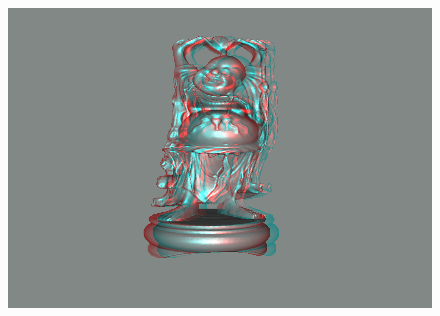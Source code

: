 \documentclass{beamer}
\begin{document}
%
	
\begin{frame} 
\begin{figure}
\hspace*{-1cm}
\centering
\includegraphics[scale=0.6]{happy_dubois.png}
\end{figure}

\end{frame}

\end{document}
